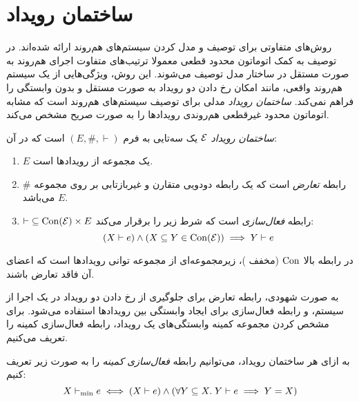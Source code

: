 \section{ساختمان رویداد}\label{sec:event-structure}

روش‌های متفاوتی برای توصیف و مدل کردن
سیستم‌های هم‌روند ارائه شده‌اند.
در توصیف به کمک اتوماتون محدود قطعی
معمولا ترتیب‌های متفاوت اجرای هم‌روند به صورت مستقل
در ساختار مدل توصیف می‌شوند. این روش، ویژگی‌هایی از
یک سیستم هم‌روند واقعی، مانند امکان رخ دادن دو رویداد
به صورت مستقل و بدون وابستگی را فراهم نمی‌کند.
\textit{ساختمان رویداد}
مدلی برای توصیف سیستم‌های هم‌روند است که مشابه
اتوماتون محدود غیرقطعی
هم‌روندی رویدادها را به صورت صریح مشخص می‌کند.

\begin{definition}\label{def:event-structure}
  \textit{ساختمان رویداد}
  $\mathcal{E}$
  یک سه‌تایی به فرم
  $(E, \#, \vdash)$
  است که در آن:
  \begin{enumerate}
    \item $E$
    یک مجموعه از رویداد‌ها است.
    \item $\#$
    رابطه
    \textit{تعارض}
    است که یک رابطه دودویی متقارن و غیربازتابی بر روی مجموعه
    $E$
    می‌باشد.

    \item $\vdash\;\subseteq \operatorname{Con}(\mathcal{E}) \times E$
    رابطه
    \textit{فعال‌سازی}
    است که شرط زیر را برقرار می‌کند:
    \begin{equation*}
        (X \vdash e) \wedge (X \subseteq Y \in \operatorname{Con}(\mathcal{E}))
        \implies Y \vdash e
    \end{equation*}
  \end{enumerate}
\end{definition}

در رابطه بالا
$\operatorname{Con}$
(مخفف
)،
زیرمجموعه‌ای از مجموعه توانی رویدادها است که اعضای آن فاقد تعارض باشند.

به صورت شهودی، رابطه تعارض برای جلوگیری از رخ دادن
دو رویداد در یک اجرا از سیستم،
و رابطه فعال‌سازی برای ایجاد وابستگی بین رویدادها استفاده می‌شود.
برای مشخص کردن مجموعه کمینه وابستگی‌های یک رویداد،
رابطه فعال‌سازی کمینه را تعریف می‌کنیم.

\begin{definition}\label{def:min-enabling}
  به ازای هر ساختمان رویداد، می‌توانیم رابطه
  \textit{فعال‌سازی کمینه}
  را به صورت زیر تعریف کنیم:
  \begin{equation*}
    X \vdash_{\min} e \iff
    (X \vdash e) \wedge
    (\forall Y \subseteq X.\;Y \vdash e \implies Y=X)
  \end{equation*}
\end{definition}

